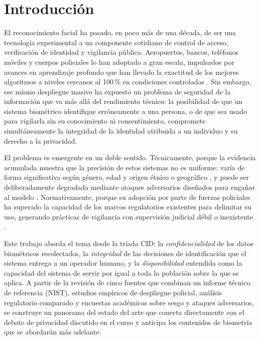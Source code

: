 %
\section{Introducción}
\label{sec:introduccion}

El reconocimiento facial ha pasado, en poco más de una d\'ecada, de ser
una tecnolog\'ia experimental a un componente cotidiano de control de
acceso, verificaci\'on de identidad y vigilancia p\'ublica. Aeropuertos,
bancos, tel\'efonos m\'oviles y cuerpos policiales lo han adoptado a
gran escala, impulsados por avances en aprendizaje profundo que han
llevado la exactitud de los mejores algoritmos a niveles cercanos al
100\,\% en condiciones controladas \cite{grother_nistir8280_2019}. Sin
embargo, ese mismo despliegue masivo ha expuesto un problema de
seguridad de la informaci\'on que va m\'as all\'a del rendimiento
t\'ecnico: la posibilidad de que un sistema biom\'etrico identifique
err\'oneamente a una persona, o de que sea usado para vigilarla sin su
conocimiento ni consentimiento, compromete simult\'aneamente la
integridad de la identidad atribuida a un individuo y su derecho a la
privacidad.

El problema es emergente en un doble sentido. T\'ecnicamente, porque
la evidencia acumulada muestra que la precisi\'on de estos sistemas no
es uniforme: var\'ia de forma significativa seg\'un g\'enero, edad y
origen \'etnico o geogr\'afico
\cite{grother_nistir8280_2019,kotwal_fairness_2026}, y puede ser
deliberadamente degradada mediante ataques adversarios dise\~nados
para enga\~nar al modelo \cite{vakhshiteh_adversarial_2021}.
Normativamente, porque su adopci\'on por parte de fuerzas policiales
ha superado la capacidad de los marcos regulatorios existentes para
delimitar su uso, generando pr\'acticas de vigilancia con supervisi\'on
judicial d\'ebil o inexistente
\cite{fussey_assisted_2020,almeida_ethics_2022}.

Este trabajo aborda el tema desde la tr\'iada CID: la
\emph{confidencialidad} de los datos biom\'etricos recolectados, la
\emph{integridad} de las decisiones de identificaci\'on que el sistema
entrega a un operador humano, y la \emph{disponibilidad} entendida
como la capacidad del sistema de servir por igual a toda la poblaci\'on
sobre la que se aplica. A partir de la revisi\'on de cinco fuentes que
combinan un informe t\'ecnico de referencia (NIST), estudios emp\'iricos
de despliegue policial, an\'alisis regulatorio comparado y encuestas
acad\'emicas sobre sesgo y ataques adversarios, se construye un
panorama del estado del arte que conecta directamente con el debate de
privacidad discutido en el curso y anticipa los contenidos de
biometr\'ia que se abordar\'an m\'as adelante.
